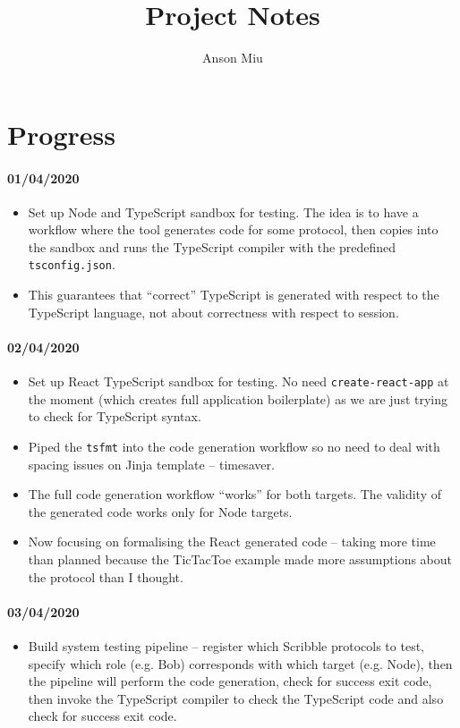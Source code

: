 \documentclass{article}
\title{Project Notes}
\author{Anson Miu}
\begin{document}
\maketitle

\section{Progress}

\paragraph{01/04/2020}
\begin{itemize}
\item 
Set up Node and TypeScript sandbox for testing.
The idea is to have a workflow where the
tool generates code for some protocol,
then copies into the sandbox and runs
the TypeScript compiler with the predefined
\texttt{tsconfig.json}. 

\item
This guarantees that ``correct'' TypeScript is
generated with respect to the TypeScript 
language, not about correctness with respect
to session.
\end{itemize}


\paragraph{02/04/2020}
\begin{itemize}
\item
Set up React TypeScript sandbox for testing.
No need \texttt{create-react-app} at
the moment (which creates full application
boilerplate) as we are just trying to check
for TypeScript syntax.

\item
Piped the \texttt{tsfmt} into the code 
generation workflow so no need to deal with
spacing issues on Jinja template -- timesaver.

\item
The full code generation workflow ``works'' for 
both targets. The validity of the generated 
code works only for Node targets.

\item
Now focusing on formalising the React generated 
code -- taking more time than planned because
the TicTacToe example made more assumptions
about the protocol than I thought.
\end{itemize}


\paragraph{03/04/2020}
\begin{itemize}
\item
Build system testing pipeline -- register which
Scribble protocols to test, specify which role
(e.g. Bob) corresponds with which target (e.g. Node),
then the pipeline will perform the code generation,
check for success exit code, then invoke the
TypeScript compiler to check the TypeScript code
and also check for success exit code.
\end{itemize}
\end{document}
